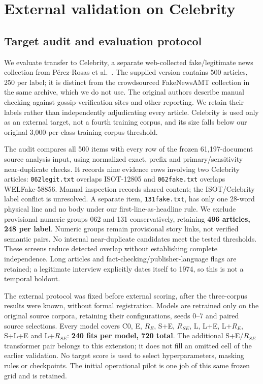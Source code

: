 \section{External validation on Celebrity}\label{sec:external}
\subsection{Target audit and evaluation protocol}
We evaluate transfer to Celebrity, a separate web-collected fake/legitimate news collection from P\'erez-Rosas et al.~\cite{perezrosas2018automatic}. The supplied version contains 500 articles, 250 per label; it is distinct from the crowdsourced FakeNewsAMT collection in the same archive, which we do not use. The original authors describe manual checking against gossip-verification sites and other reporting. We retain their labels rather than independently adjudicating every article. Celebrity is used only as an external target, not a fourth training corpus, and its size falls below our original 3,000-per-class training-corpus threshold.

The audit compares all 500 items with every row of the frozen 61,197-document source analysis input, using normalized exact, prefix and primary/sensitivity near-duplicate checks. It records nine evidence rows involving two Celebrity articles: \texttt{062legit.txt} overlaps ISOT-12805 and \texttt{062fake.txt} overlaps WELFake-58856. Manual inspection records shared content; the ISOT/Celebrity label conflict is unresolved. A separate item, \texttt{131fake.txt}, has only one 28-word physical line and no body under our first-line-as-headline rule. We exclude provisional numeric groups 062 and 131 conservatively, retaining \textbf{496 articles, 248 per label}. Numeric groups remain provisional story links, not verified semantic pairs. No internal near-duplicate candidates meet the tested thresholds. These screens reduce detected overlap without establishing complete independence. Long articles and fact-checking/publisher-language flags are retained; a legitimate interview explicitly dates itself to 1974, so this is not a temporal holdout.

The external protocol was fixed before external scoring, after the three-corpus results were known, without formal registration. Models are retrained only on the original source corpora, retaining their configurations, seeds 0--7 and paired source selections. Every model covers C0, E, $R_E$, S+E, $R_{SE}$, L, L+E, L+$R_E$, S+L+E and L+$R_{SE}$: \textbf{240 fits per model, 720 total}. The additional S+E/$R_{SE}$ transformer pair belongs to this extension; it does not fill an omitted cell of the earlier validation. No target score is used to select hyperparameters, masking rules or checkpoints. The initial operational pilot is one job of this same frozen grid and is retained.

